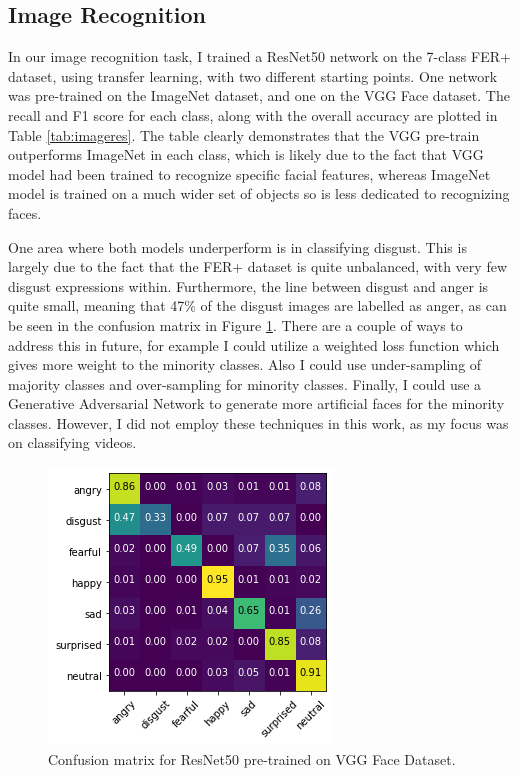 \documentclass[sigconf]{acmart}
\begin{document}
{\subsection{Image Recognition}


In our image recognition task, I trained a ResNet50 network on the 7-class FER+
dataset, using transfer learning, with two different starting points. One
network was pre-trained on the ImageNet dataset, and one on the VGG Face
dataset. The recall and F1 score for each class, along with the overall
accuracy are plotted in Table \ref{tab:imageres}. The table clearly
demonstrates that the VGG pre-train outperforms ImageNet in each class, which
is likely due to the fact that VGG model had been trained to recognize specific facial
features, whereas ImageNet model is trained on a much wider set of objects so is
less dedicated to recognizing faces.

One area where both models underperform is in classifying disgust. This is largely
due to the fact that the FER+ dataset is quite unbalanced, with very few
disgust expressions within. Furthermore, the line between disgust and anger is
quite small, meaning that 47\% of the disgust images are labelled as
anger,
as can be seen in the confusion matrix in Figure \ref{fig:image-vgg}. There
are a couple of ways to address this in future, for example I could utilize a
weighted loss function which gives more weight to the minority
classes. Also I could use under-sampling of majority classes and over-sampling
for minority classes. Finally, I could use a Generative
Adversarial Network to generate more artificial faces for the minority
classes. However, I did not employ these techniques in this work, as my focus
was on classifying videos.

\begin{figure}[htbp]
	\includegraphics[width=0.7\linewidth]{images/image-vgg.png}
	\caption{Confusion matrix for ResNet50 pre-trained on VGG Face Dataset.}
  \label{fig:image-vgg}
\end{figure}




}
\end{document}
